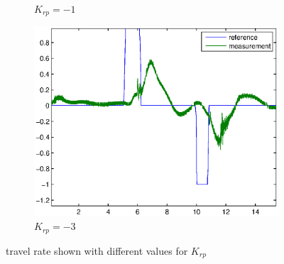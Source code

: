 \begin{figure}[H]
\begin{subfigure}{0.5\textwidth}
    \caption{$K_{rp}= -1$}
\end{subfigure}
\begin{subfigure}{0.5\textwidth}
    \includegraphics[width=0.9\linewidth]{Part2_pictures/p2p2/Krp3travelrate.eps}
    \caption{$K_{rp}= -3$}
\end{subfigure}
\caption{travel rate shown with different values for $K_{rp}$}
\end{figure}

